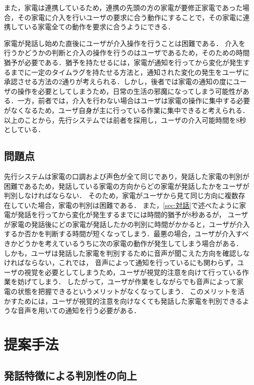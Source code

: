 \documentclass[a4j,12pt,twoside]{jreport}
\begin{document}
また，家電は連携しているため，連携の先頭の方の家電が要修正家電であった場合，その家電に介入を行いユーザの要求に合う動作にすることで，その家電に連携している家電全ての動作を要求に合うようにできる．

家電が発話し始めた直後にユーザが介入操作を行うことは困難である．
介入を行うかどうかの判断と介入の操作を行うのはユーザであるため，そのための時間猶予が必要である．猶予を持たせるには，家電が通知を行ってから変化が発生するまでに一定のタイムラグを持たせる方法と，通知された変化の発生をユーザに承認させる方法の2通りが考えられる．しかし，後者では家電の通知の度にユーザの操作を必要としてしまうため，日常の生活の邪魔になってしまう可能性がある．一方，前者では，介入を行わない場合はユーザは家電の操作に集中する必要がなくなるため，ユーザ自身が主に行っている作業に集中できると考えられる．
以上のことから，先行システムでは前者を採用し，ユーザの介入可能時間を8秒としている．

\section{問題点}
\label{sec:問題}
先行システムは家電の口調および声色が全て同じであり，発話した家電の判別が困難であるため，発話している家電の方向からどの家電が発話したかをユーザが判別しなければならない．
そのため，家電がユーザから見て同じ方向に複数存在していた場合，家電の判別は困難である．
また，\ref{sec:対話}で述べたように家電が発話を行ってから変化が発生するまでには時間的猶予が8秒あるが，
ユーザが家電の発話後にどの家電が発話したかの判別に時間がかかると，ユーザが介入するか否かを判断する時間が短くなってしまう．最悪の場合，ユーザが介入すべきかどうかを考えているうちに次の家電の動作が発生してしまう場合がある．
しかも，ユーザは発話した家電を判別するために音声が聞こえた方向を確認しなければならない，これでは，
音声によって通知を行っているにも関わらず，ユーザの視覚を必要としてしまうため，ユーザが視覚的注意を向けて行っている作業を妨げてしまう．
したがって，ユーザが作業をしながらでも音声によって家電の状態を把握できるというメリットがなくなってしまう．
このメリットを活かすためには，ユーザが視覚的注意を向けなくても発話した家電を判別できるような音声を用いての通知を行う必要がある．

\chapter{提案手法} 

\section{発話特徴による判別性の向上}
\end{document}
